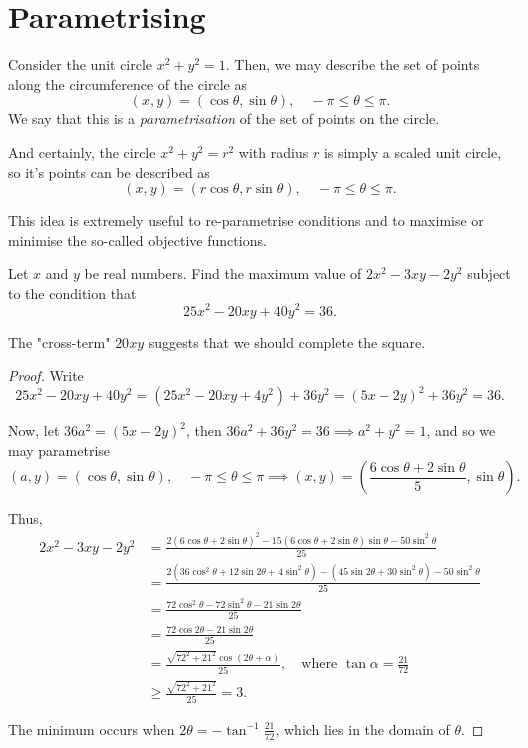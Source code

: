 \documentclass[../jarvis.tex]{subfiles}
\begin{document}
\section{Parametrising \med}
Consider the unit circle $x^2+y^2=1$. Then, we may describe the set of points along the circumference of the circle as
$$(x,y)=(\cos\theta, \sin\theta), \quad -\pi\leq\theta\leq\pi.$$
We say that this is a \textit{parametrisation} of the set of points on the circle.

And certainly, the circle $x^2+y^2=r^2$ with radius $r$ is simply a scaled unit circle, so it's points can be described as
$$(x,y)=(r\cos\theta, r\sin\theta), \quad -\pi\leq\theta\leq\pi.$$

This idea is extremely useful to re-parametrise conditions and to maximise or minimise the so-called objective functions.
\begin{example}[2018 SMO(S) P11]
    Let $x$ and $y$ be real numbers. Find the maximum value of $2x^2-3xy-2y^2$ subject to the condition that
    $$25x^2-20xy+40y^2=36.$$
\end{example}
The "cross-term" $20xy$ suggests that we should complete the square. 

\begin{proof}
    Write $$25x^2-20xy+40y^2=(25x^2-20xy+4y^2)+36y^2=(5x-2y)^2+36y^2=36.$$
    
    Now, let $36a^2=(5x-2y)^2$, then $36a^2+36y^2=36 \implies a^2+y^2=1$, and so we may parametrise 
    $$(a,y)=(\cos\theta,\sin\theta),\quad -\pi\leq\theta\leq\pi \implies (x,y)=\left(\frac{6\cos\theta+2\sin\theta}{5}, \sin\theta\right).$$
    
    Thus, \begin{align*}
        2x^2-3xy-2y^2&=\frac{2(6\cos\theta+2\sin\theta)^2-15(6\cos\theta+2\sin\theta)\sin\theta-50\sin^2\theta}{25} \\
        &=\frac{2(36\cos^2\theta+12\sin 2\theta+4\sin^2\theta)-(45\sin2\theta+30\sin^2\theta)-50\sin^2\theta}{25} \\
        &=\frac{72\cos^2\theta-72\sin^2\theta-21\sin2\theta}{25} \\
        &=\frac{72\cos2\theta-21\sin2\theta}{25} \\
        &=\frac{\sqrt{72^2+21^2}\cos(2\theta+\alpha)}{25}, \quad \text{where }\tan\alpha=\frac{21}{72} \\
        &\geq\frac{\sqrt{72^2+21^2}}{25}=\boxed{3}.
    \end{align*}
    
    The minimum occurs when $2\theta=-\tan^{-1}\frac{21}{72}$, which lies in the domain of $\theta$.
\end{proof}
\end{document}
